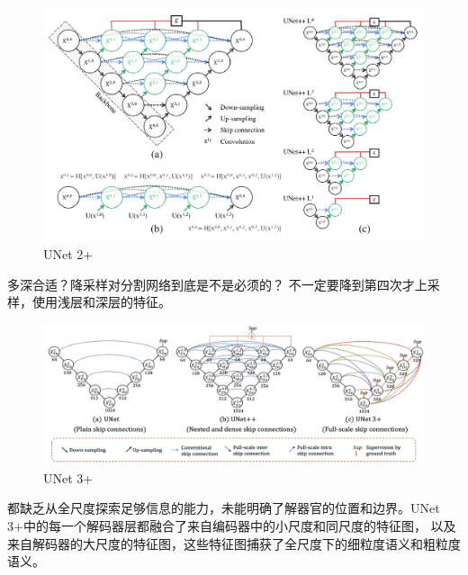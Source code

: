 \begin{figure}[H]
    \centering
    \includegraphics[width=14cm]{images/unet2+.png}
    \caption{UNet 2+}
    \label{fig:unet2p}
\end{figure}

多深合适？降采样对分割网络到底是不是必须的？
不一定要降到第四次才上采样，使用浅层和深层的特征。

\begin{figure}[H]
    \centering
    \includegraphics[width=14cm]{images/unet3+.png}
    \caption{UNet 3+}
    \label{fig:unet3p}
\end{figure}
都缺乏从全尺度探索足够信息的能力，未能明确了解器官的位置和边界。UNet 3+中的每一个解码器层都融合了来自编码器中的小尺度和同尺度的特征图，
以及来自解码器的大尺度的特征图，这些特征图捕获了全尺度下的细粒度语义和粗粒度语义。